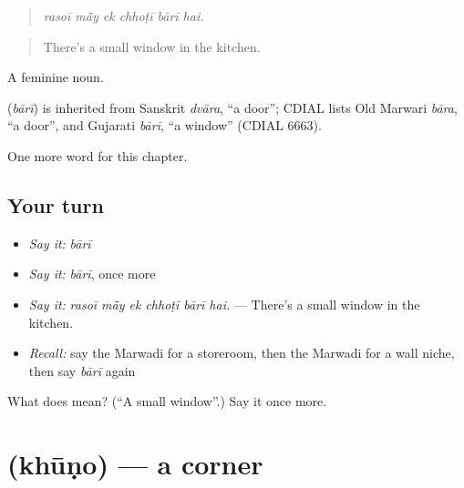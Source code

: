 \begin{quote}
     
\end{quote}

\begin{quote}
\emph{rasoī mā̃y ek chhoṭī bārī hai.}
\end{quote}

\begin{quote}
There's a small window in the kitchen.
\end{quote}

A feminine noun.

\begin{cousinweb}
\textbf{} (\emph{bārī}) is inherited from Sanskrit \emph{dvāra}, \textquotedblleft{}a door\textquotedblright{}; CDIAL lists Old Marwari \emph{bāra}, \textquotedblleft{}a door\textquotedblright{}, and Gujarati \emph{bārī}, \textquotedblleft{}a window\textquotedblright{} (CDIAL 6663).
\end{cousinweb}

\begin{grammarlens}[title={What you've built}]
One more word for this chapter.
\end{grammarlens}

\subsection*{Your turn}
\begin{itemize}
\raggedright
  \item \emph{Say it:} \emph{bārī}
  \item \emph{Say it:} \emph{bārī}, once more
  \item \emph{Say it:} \emph{rasoī mā̃y ek chhoṭī bārī hai.} — There's a small window in the kitchen.
  \item \emph{Recall:} say the Marwadi for a storeroom, then the Marwadi for a wall niche, then say \emph{bārī} again
\end{itemize}

\begin{tcolorbox}[breakable,colback=teal!4,colframe=teal!35!black,title={Before you move on}]
What does  mean? (\textquotedblleft{}A small window\textquotedblright{}.) Say it once more.
\end{tcolorbox}
\section[\texorpdfstring{\mw{खूणो} (khūṇo)}{खूणो (khūṇo)}]{ (khūṇo) — a corner}

